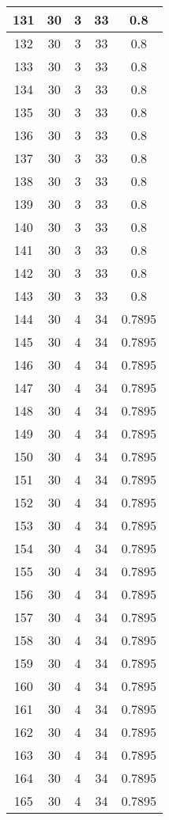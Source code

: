 \documentclass[letterpaper, 12pt]{article}
\begin{document}
\begin{longtable}{|c|c|c|c|c|}
\hline
131 & 30 & 3 & 33 & 0.8 \\
\hline
132 & 30 & 3 & 33 & 0.8 \\
\hline
133 & 30 & 3 & 33 & 0.8 \\
\hline
134 & 30 & 3 & 33 & 0.8 \\
\hline
135 & 30 & 3 & 33 & 0.8 \\
\hline
136 & 30 & 3 & 33 & 0.8 \\
\hline
137 & 30 & 3 & 33 & 0.8 \\
\hline
138 & 30 & 3 & 33 & 0.8 \\
\hline
139 & 30 & 3 & 33 & 0.8 \\
\hline
140 & 30 & 3 & 33 & 0.8 \\
\hline
141 & 30 & 3 & 33 & 0.8 \\
\hline
142 & 30 & 3 & 33 & 0.8 \\
\hline
143 & 30 & 3 & 33 & 0.8 \\
\hline
144 & 30 & 4 & 34 & 0.7895 \\
\hline
145 & 30 & 4 & 34 & 0.7895 \\
\hline
146 & 30 & 4 & 34 & 0.7895 \\
\hline
147 & 30 & 4 & 34 & 0.7895 \\
\hline
148 & 30 & 4 & 34 & 0.7895 \\
\hline
149 & 30 & 4 & 34 & 0.7895 \\
\hline
150 & 30 & 4 & 34 & 0.7895 \\
\hline
151 & 30 & 4 & 34 & 0.7895 \\
\hline
152 & 30 & 4 & 34 & 0.7895 \\
\hline
153 & 30 & 4 & 34 & 0.7895 \\
\hline
154 & 30 & 4 & 34 & 0.7895 \\
\hline
155 & 30 & 4 & 34 & 0.7895 \\
\hline
156 & 30 & 4 & 34 & 0.7895 \\
\hline
157 & 30 & 4 & 34 & 0.7895 \\
\hline
158 & 30 & 4 & 34 & 0.7895 \\
\hline
159 & 30 & 4 & 34 & 0.7895 \\
\hline
160 & 30 & 4 & 34 & 0.7895 \\
\hline
161 & 30 & 4 & 34 & 0.7895 \\
\hline
162 & 30 & 4 & 34 & 0.7895 \\
\hline
163 & 30 & 4 & 34 & 0.7895 \\
\hline
164 & 30 & 4 & 34 & 0.7895 \\
\hline
165 & 30 & 4 & 34 & 0.7895 \\

\end{longtable}
\end{document}
